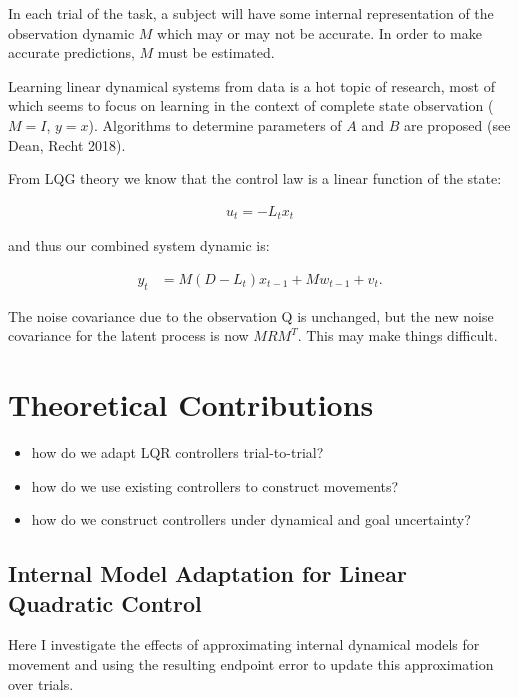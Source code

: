 \documentclass[
  a4paper,
]{article}
\providecommand{\tightlist}{%
  \setlength{\itemsep}{0pt}\setlength{\parskip}{0pt}}
\begin{document}
In each trial of the task, a subject will have some internal
representation of the observation dynamic \(M\) which may or may not be
accurate. In order to make accurate predictions, \(M\) must be
estimated.

Learning linear dynamical systems from data is a hot topic of research,
most of which seems to focus on learning in the context of complete
state observation (\(M=I\), \(y=x\)). Algorithms to determine parameters
of \(A\) and \(B\) are proposed (see Dean, Recht 2018).

From LQG theory we know that the control law is a linear function of the
state:

\begin{align*}
u_t = -L_tx_t
\end{align*}

and thus our combined system dynamic is:

\begin{align*}
y_t &= M(D-L_t)x_{t-1} + Mw_{t-1} + v_t.
\end{align*}

The noise covariance due to the observation Q is unchanged, but the new
noise covariance for the latent process is now \(MRM^T\). This may make
things difficult.

\hypertarget{sec:bg_experiment}{%
\section{Theoretical Contributions}\label{sec:bg_experiment}}

\begin{itemize}
\tightlist
\item
  how do we adapt LQR controllers trial-to-trial?
\item
  how do we use existing controllers to construct movements?
\item
  how do we construct controllers under dynamical and goal uncertainty?
\end{itemize}

\hypertarget{internal-model-adaptation-for-linear-quadratic-control}{%
\subsection{Internal Model Adaptation for Linear Quadratic
Control}\label{internal-model-adaptation-for-linear-quadratic-control}}

Here I investigate the effects of approximating internal dynamical
models for movement and using the resulting endpoint error to update
this approximation over trials.
\end{document}
